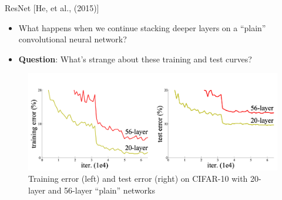 \documentclass[serif, aspectratio=169]{beamer}
\begin{document}
\begin{frame}{ResNet [He, et al., (2015)]}
	\begin{itemize}
		\item What happens when we continue stacking deeper layers on a ``plain'' convolutional neural network?
		\item \textbf{Question}: What’s strange about these training and test curves?
	\end{itemize}
	\begin{figure}[htpb]
		\begin{center}
			\includegraphics[keepaspectratio, scale=0.17]{pic/plain}
			\captionsetup{justification=centering}
			\caption*{\scriptsize{Training error (left) and test error (right) on CIFAR-10 with 20-layer and 56-layer “plain” networks}}
		\end{center}
	\end{figure}
\end{frame}
\end{document}
